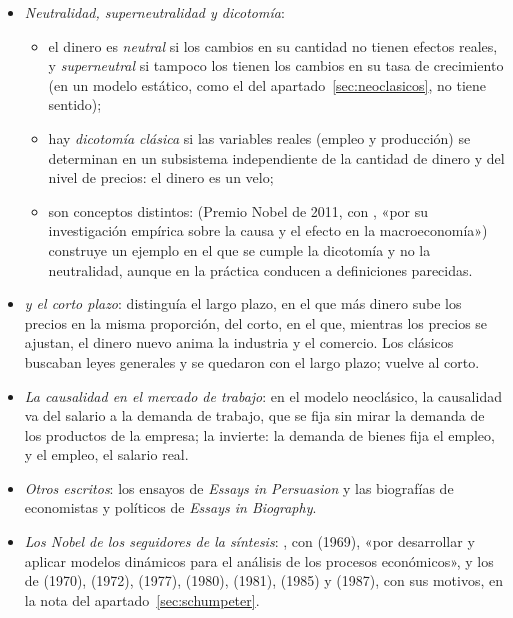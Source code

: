 \documentclass[11pt]{article}
\begin{document}
\begin{anotaciones}
\begin{itemize}
\item \emph{Neutralidad, superneutralidad y dicotomía}:
  \begin{itemize}
  \item el dinero es \emph{neutral} si los cambios en su cantidad no tienen efectos reales, y \emph{superneutral} si tampoco los tienen los cambios en su tasa de crecimiento (en un modelo estático, como el del apartado~\ref{sec:neoclasicos}, no tiene sentido);
  \item hay \emph{dicotomía clásica} si las variables reales (empleo y producción) se determinan en un subsistema independiente de la cantidad de dinero y del nivel de precios: el dinero es un velo;
  \item son conceptos distintos: \textcite{Sargent1979Macroeconomic} (Premio Nobel de 2011, con , «por su investigación empírica sobre la causa y el efecto en la macroeconomía»\nocite{Nobel2011SargentSims}) construye un ejemplo en el que se cumple la dicotomía y no la neutralidad, aunque en la práctica conducen a definiciones parecidas.
  \end{itemize}
\item \emph{ y el corto plazo}: \textcite{Hume1752Money} distinguía el largo plazo, en el que más dinero sube los precios en la misma proporción, del corto, en el que, mientras los precios se ajustan, el dinero nuevo anima la industria y el comercio. Los clásicos buscaban leyes generales y se quedaron con el largo plazo;  vuelve al corto.
\item \emph{La causalidad en el mercado de trabajo}: en el modelo neoclásico, la causalidad va del salario a la demanda de trabajo, que se fija sin mirar la demanda de los productos de la empresa;  la invierte: la demanda de bienes fija el empleo, y el empleo, el salario real\nocite{Gali2013Keynes}.
\item \emph{Otros escritos}: los ensayos de \emph{Essays in Persuasion}\nocite{Keynes1931Essays} y las biografías de economistas y políticos de \emph{Essays in Biography}\nocite{Keynes1933Essays}.
\item \emph{Los Nobel de los seguidores de la síntesis}\nocite{Nobel2026Economia}: , con  (1969), «por desarrollar y aplicar modelos dinámicos para el análisis de los procesos económicos»\nocite{Nobel1969}, y los de  (1970),  (1972),  (1977),  (1980),  (1981),  (1985) y  (1987), con sus motivos, en la nota del apartado~\ref{sec:schumpeter}.

\end{itemize}
\end{anotaciones}
\end{document}
